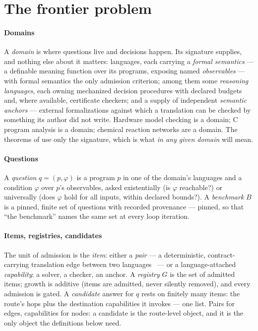 
\section{The frontier problem}
\label{sec:problem}

\paragraph{Domains}
A \emph{domain} is where questions live and decisions happen. Its
signature supplies, and nothing else about it matters:
languages, each carrying a \emph{formal semantics} --- a definable
meaning function over its programs, exposing named \emph{observables}
--- with formal semantics the only admission criterion; among them
some \emph{reasoning languages}, each owning mechanized decision
procedures with declared budgets and, where available, certificate
checkers; and a supply of independent \emph{semantic anchors} ---
external formalizations against which a translation can be checked by
something its author did not write. Hardware model checking is a
domain; C program analysis is a domain; chemical reaction networks
are a domain. The theorems of  use only the
signature, which is what \emph{in any given domain} will mean.

\paragraph{Questions}
A \emph{question} $q = (p, \varphi)$ is a program $p$ in one of the
domain's languages and a condition $\varphi$ over $p$'s observables,
asked existentially (is $\varphi$ reachable?) or universally (does
$\varphi$ hold for all inputs, within declared bounds?). A
\emph{benchmark} $B$ is a pinned, finite set of questions with
recorded provenance --- pinned, so that ``the benchmark'' names the
same set at every loop iteration.

\paragraph{Items, registries, candidates}
The unit of admission is the \emph{item}: either a \emph{pair} --- a
deterministic, contract-carrying translation edge between two
languages~\citep{hurdygurdy2026calculus} --- or a language-attached
\emph{capability}: a solver, a checker, an anchor. A \emph{registry}
$G$ is the set of admitted items; growth is additive (items are
admitted, never silently removed), and every admission is gated. A
\emph{candidate} answer for $q$ rests on finitely many items: the
route's hops plus the destination capabilities it invokes --- one
list. Pairs for edges, capabilities for nodes: a candidate is the
route-level object, and it is the only object the definitions below
need.

